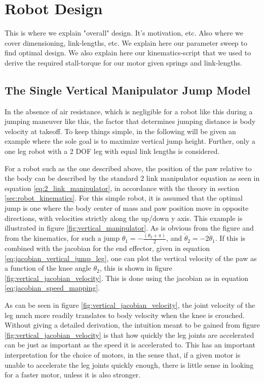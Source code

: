 \section{Robot Design}
\label{sec:robot_design}

This is where we explain "overall" design. It's motivation, etc. 
Also where we cover dimensioning, link-lengths, etc. 
We explain here our parameter sweep to find optimal design. 
We also explain here our kinematics-script that we used to derive the required stall-torque for our motor given springs and link-lengths. 

\subsection{The Single Vertical Manipulator Jump Model}

In the absence of air resistance, which is negligible for a robot like this during a jumping maneuver like this, the factor that determines jumping distance is body velocity at takeoff. To keep things simple, in the following will be given an example where the sole goal is to maximize vertical jump height. Further, only a one leg robot with a 2 DOF leg with equal link lengths is considered. 

For a robot such as the one described above, the position of the paw relative to the body can be described by the standard 2 link manipulator equation as seen in equation \ref{eq:2_link_manipulator}, in accordance with the theory in section \ref{sec:robot_kinematics}. For this simple robot, it is assumed that the optimal jump is one where the body center of mass and paw position move in opposite directions, with velocities strictly along the up/down y axis. This example is illustrated in figure \ref{fig:vertical_manipulator}. As is obvious from the figure and from the kinematics, for such a jump $\theta_1 = -\frac{(\theta_2+\pi)}{2}$, and $\dot{\theta}_2=-2\dot{\theta}_1$. If this is combined with the jacobian for the end effector, given in equation \ref{eq:jacobian_vertical_jump_leg}, one can plot the vertical velocity of the paw as a function of the knee angle $\theta_2$, this is shown in figure \ref{fig:vertical_jacobian_velocity}. This is done using the jacobian as in equation \ref{eq:jacobian_speed_mapping}. 

As can be seen in figure \ref{fig:vertical_jacobian_velocity}, the joint velocity of the leg much more readily translates to body velocity when the knee is crouched. Without giving a detailed derivation, the intuition meant to be gained from figure \ref{fig:vertical_jacobian_velocity} is that how quickly the leg joints are accelerated can be just as important as the speed it is accelerated to. This has an important interpretation for the choice of motors, in the sense that, if a given motor is unable to accelerate the leg joints quickly enough, there is little sense in looking for a faster motor, unless it is also stronger. 

